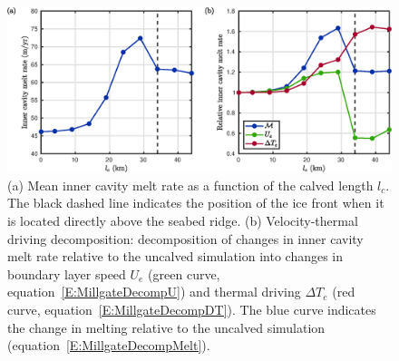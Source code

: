 \documentclass[draft]{agujournal2019}
\begin{document}
\begin{figure}
    \centering
    \includegraphics[width = \textwidth]{../make_figures/plots/figure4.eps}
    \caption{(a) Mean inner cavity melt rate as a function of the calved length $l_c$. The black dashed line indicates the position of the ice front when it is located directly above the seabed ridge. (b) Velocity-thermal driving decomposition: decomposition of changes in inner cavity melt rate relative to the uncalved simulation into changes in boundary layer speed $U_e$ (green curve, equation~\eqref{E:MillgateDecompU}) and thermal driving $\Delta T_e$ (red curve, equation~\eqref{E:MillgateDecompDT}). The blue curve indicates the change in melting relative to the uncalved simulation (equation~\eqref{E:MillgateDecompMelt}).}
    \label{fig:figure4}
\end{figure}
\end{document}
